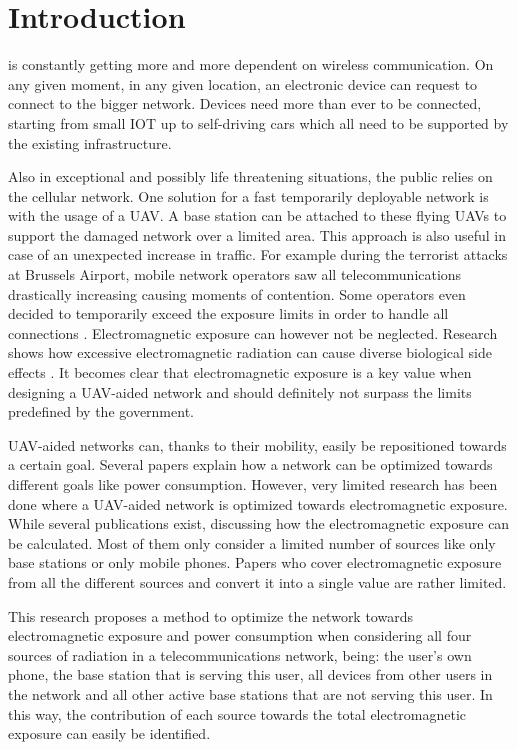 \documentclass[twocolumn]{phdsymp} %
\begin{document}
\section{Introduction}
 is constantly getting more and more dependent on wireless communication. 
On any given moment, in any given location, an electronic device
can request to connect to the bigger network. Devices need more than ever to be connected, 
starting from small \gls{IOT} up to self-driving cars
which all need to be supported by the existing infrastructure. 

Also in exceptional and possibly life threatening situations, the public relies on the cellular network. 
One solution for a fast temporarily deployable network is with the usage of a \gls{UAV}. A base station can be attached to 
these flying \gls{UAV}s to support the damaged network over a limited area. 
This approach is also useful in case of an unexpected increase in traffic. 
For example during the terrorist attacks at Brussels Airport,
mobile network operators saw all telecommunications drastically increasing causing moments of contention. 
Some operators even decided to temporarily exceed the exposure limits in
order to handle all connections \cite{baseZaventem}.
Electromagnetic exposure can however not be neglected. 
Research shows how excessive electromagnetic radiation can cause diverse biological side effects \cite{bioeffects, WHO}.
It becomes clear that electromagnetic exposure is a key value when designing a \gls{UAV}-aided network and should definitely 
not surpass the limits predefined by the government.

\gls{UAV}-aided networks can, thanks to their mobility, easily be repositioned towards a certain goal. Several papers 
explain how a network can be optimized towards different goals like power consumption.
However, very limited
research has been done where a \gls{UAV}-aided network is optimized towards electromagnetic exposure.
While several publications exist, discussing how the electromagnetic exposure can be calculated. 
Most of them only consider a limited number of sources like only base stations or only mobile phones.
Papers who cover electromagnetic exposure from all the different sources and convert it into a single value are rather limited.

This research proposes a method to optimize the network towards electromagnetic exposure and power consumption
when considering all four sources of radiation in a telecommunications network, being: the user's own phone,
 the base station that is serving this user, 
all devices from other users in the network and all 
other active base stations that are not serving this user. In this way, the contribution of each source towards the total 
electromagnetic exposure can easily be identified. 
\end{document}
